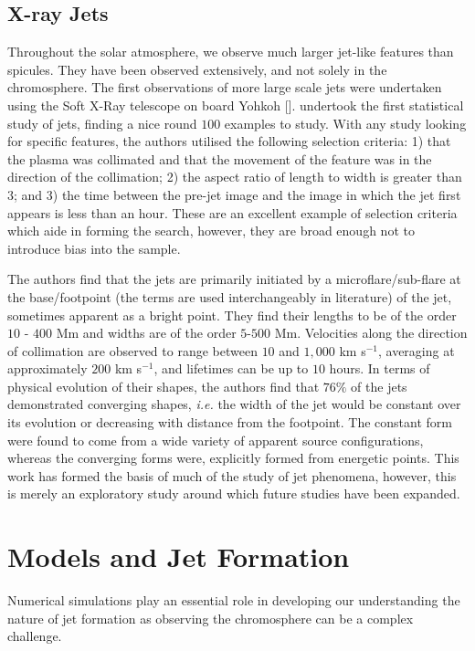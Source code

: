 \subsection{X-ray Jets}
\label{sec:xjets}
Throughout the solar atmosphere, we observe much larger jet-like features than spicules.
They have been observed extensively, and not solely in the chromosphere.
The first observations of more large scale jets were undertaken using the Soft X-Ray telescope on board Yohkoh [\cite{Tsuneta1991}].
\cite{Shimojo1996} undertook the first statistical study of jets, finding a nice round $100$ examples to study.
With any study looking for specific features, the authors utilised the following selection criteria: 1) that the plasma was collimated and that the movement of the feature was in the direction of the collimation; 2) the aspect ratio of length to width is greater than $3$; and 3) the time between the pre-jet image and the image in which the jet first appears is less than an hour.
These are an excellent example of selection criteria which aide in forming the search, however, they are broad enough not to introduce bias into the sample.

The authors find that the jets are primarily initiated by a microflare/sub-flare at the base/footpoint (the terms are used interchangeably in literature) of the jet, sometimes apparent as a bright point.
They find their lengths to be of the order $10$ - $400$ Mm and widths are of the order $5$-$500$ Mm.
Velocities along the direction of collimation are observed to range between $10$ and $1,000$ km s$^{-1}$, averaging at approximately $200$ km s$^{-1}$, and lifetimes can be up to $10$ hours.
In terms of physical evolution of their shapes, the authors find that $76\%$ of the jets demonstrated converging shapes, \emph{i.e.} the width of the jet would be constant over its evolution or decreasing with distance from the footpoint. 
The constant form were found to come from a wide variety of apparent source configurations, whereas the converging forms were, explicitly formed from energetic points.
This work has formed the basis of much of the study of jet phenomena, however, this is merely an exploratory study around which future studies have been expanded.

\section{Models and Jet Formation}
\label{sec:models}
Numerical simulations play an essential role in developing our understanding the nature of jet formation as observing the chromosphere can be a complex challenge.

